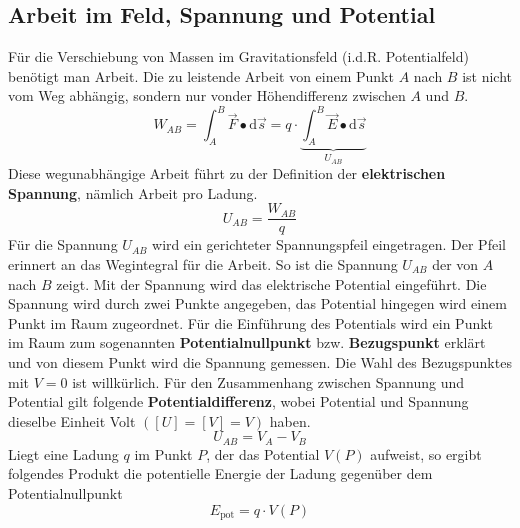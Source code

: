 \subsection{Arbeit im Feld, Spannung und Potential}
Für die Verschiebung von Massen im Gravitationsfeld (i.d.R. Potentialfeld) benötigt man Arbeit. Die zu leistende Arbeit von einem Punkt $A$ nach $B$ ist nicht vom Weg abhängig, sondern nur vonder Höhendifferenz zwischen $A$ und $B$.
\begin{equation}
\boxed{W_{AB}=\displaystyle \int_A^B\overrightarrow{F}\bullet \text{d}\overrightarrow{s}=q\cdot \underbrace{\displaystyle\int_A^B\overrightarrow{E}\bullet \text{d}\overrightarrow{s}}_{U_{AB}}}
\end{equation}
Diese wegunabhängige Arbeit führt zu der Definition der \textbf{elektrischen Spannung}, nämlich Arbeit pro Ladung.
\begin{equation}
\boxed{U_{AB}=\dfrac{W_{AB}}{q}}
\end{equation}
Für die Spannung $U_{AB}$ wird ein gerichteter Spannungspfeil eingetragen. Der Pfeil erinnert an das Wegintegral für die Arbeit. So ist die Spannung $U_{AB}$ der von $A$ nach $B$ zeigt.
\newline\newline
Mit der Spannung wird das elektrische Potential eingeführt. Die Spannung wird durch zwei Punkte angegeben, das Potential hingegen wird einem Punkt im Raum zugeordnet. Für die Einführung des Potentials wird ein Punkt im Raum zum sogenannten \textbf{Potentialnullpunkt} bzw. \textbf{Bezugspunkt} erklärt und von diesem Punkt wird die Spannung gemessen. Die Wahl des Bezugspunktes mit $V=0$ ist willkürlich. Für den Zusammenhang zwischen Spannung und Potential gilt folgende \textbf{Potentialdifferenz}, wobei Potential und Spannung dieselbe Einheit Volt $\left([U]=[V]=V\right)$ haben.
\begin{equation}
\boxed{U_{AB}=V_A-V_B}
\end{equation}
Liegt eine Ladung $q$ im Punkt $P$, der das Potential $V\left(P\right)$ aufweist, so ergibt folgendes Produkt die potentielle Energie der Ladung gegenüber dem Potentialnullpunkt
\begin{equation}
\boxed{E_{\text{pot}}=q\cdot V\left(P\right)}
\end{equation}
